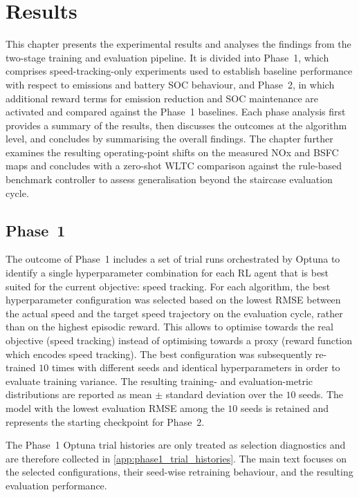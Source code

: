 \chapter{Results}
\label{chap:results}
This chapter presents the experimental results and analyses the findings from the two-stage training and evaluation pipeline. It is divided into Phase~1, which comprises speed-tracking-only experiments used to establish baseline performance with respect to emissions and battery \ac{SOC} behaviour, and Phase~2, in which additional reward terms for emission reduction and \ac{SOC} maintenance are activated and compared against the Phase~1 baselines. Each phase analysis first provides a summary of the results, then discusses the outcomes at the algorithm level, and concludes by summarising the overall findings. The chapter further examines the resulting operating-point shifts on the measured \ac{NOx} and \ac{BSFC} maps and concludes with a zero-shot \ac{WLTC} comparison against the rule-based benchmark controller to assess generalisation beyond the staircase evaluation cycle.

\section{Phase~1}
\label{sec:results_phase1}
The outcome of Phase~1 includes a set of trial runs orchestrated by Optuna to identify a single hyperparameter combination for each \ac{RL} agent that is best suited for the current objective: speed tracking. For each algorithm, the best hyperparameter configuration was selected based on the lowest \ac{RMSE} between the actual speed and the target speed trajectory on the evaluation cycle, rather than on the highest episodic reward. This allows to optimise towards the real objective (speed tracking) instead of optimising towards a proxy (reward function which encodes speed tracking). The best configuration was subsequently re-trained $10$ times with different seeds and identical hyperparameters in order to evaluate training variance. The resulting training- and evaluation-metric distributions are reported as mean $\pm$ standard deviation over the $10$ seeds. The model with the lowest evaluation \ac{RMSE} among the $10$ seeds is retained and represents the starting checkpoint for Phase~2.

The Phase~1 Optuna trial histories are only treated as selection diagnostics and are therefore collected in \autoref{app:phase1_trial_histories}. The main text focuses on the selected configurations, their seed-wise retraining behaviour, and the resulting evaluation performance.

